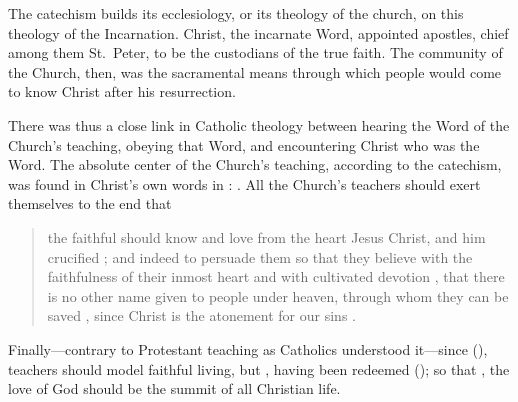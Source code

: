 The catechism builds its ecclesiology, or its theology of the church, on this theology of the Incarnation.
Christ, the incarnate Word, appointed apostles, chief among them St.\ Peter, to be the custodians of the true faith.
The community of the Church, then, was the sacramental means through which people would come to know Christ after his resurrection.

There was thus a close link in Catholic theology between hearing the Word of the Church's teaching, obeying that Word, and encountering Christ who was the Word.
The absolute center of the Church's teaching, according to the catechism, was found in Christ's own words in : .%
   \Autocite
   [6: .]
   {Catholic:Catechismus1614}
All the Church's teachers should exert themselves to the end that 
    \begin{quote}
        the faithful should know and love from the heart Jesus Christ, and him crucified ; and indeed to persuade them so that they believe with the faithfulness  of their inmost heart and with cultivated devotion , that there is no other name given to people under heaven, through whom they can be saved , since Christ is the atonement for our sins .%
            \Autocite
            [6: .]
            {Catholic:Catechismus1614}
    \end{quote}
Finally---contrary to Protestant teaching as Catholics understood it---since  (), teachers should model faithful living,  but , having been redeemed  (); so that , the love of God should be the summit of all Christian life.%
    \Autocite[6--7: ]
    {Catholic:Catechismus1614}

